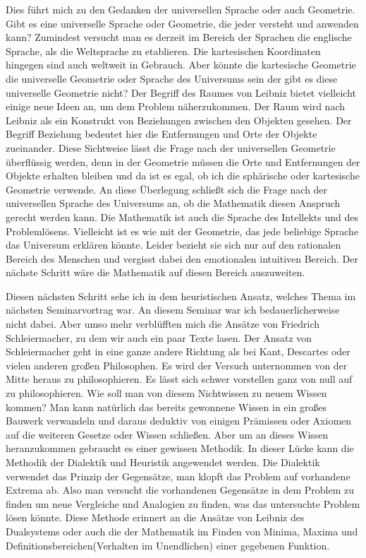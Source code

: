 \documentclass[DIN,
	fontsize=12pt,
a4paper]{scrartcl}
\begin{document}
Dies führt mich zu den Gedanken der universellen Sprache oder auch Geometrie.
Gibt es eine universelle Sprache oder Geometrie, die jeder versteht und anwenden kann? Zumindest versucht man es derzeit im Bereich der Sprachen die englische Sprache, als die Weltsprache zu etablieren.
Die kartesischen Koordinaten hingegen sind auch weltweit in Gebrauch.
Aber könnte die kartesische Geometrie die universelle Geometrie oder Sprache des Universums sein der gibt es diese universelle Geometrie nicht?
Der Begriff des Raumes von Leibniz bietet vielleicht einige neue Ideen an, um dem Problem näherzukommen.
Der Raum wird nach Leibniz als ein Konstrukt von Beziehungen zwischen den Objekten gesehen.
Der Begriff Beziehung bedeutet hier die Entfernungen und Orte der Objekte zueinander.
Diese Sichtweise lässt die Frage nach der universellen Geometrie überflüssig werden, denn in der Geometrie müssen die Orte und Entfernungen der Objekte erhalten bleiben und da ist es egal, ob ich die sphärische oder kartesische Geometrie verwende.
An diese Überlegung schließt sich die Frage nach der universellen Sprache des Universums an, ob die Mathematik diesen Anspruch gerecht werden kann.
Die Mathematik ist auch die Sprache des Intellekts und des Problemlösens.
Vielleicht ist es wie mit der Geometrie, das jede beliebige Sprache das Universum erklären könnte.
Leider bezieht sie sich nur auf den rationalen Bereich des Menschen und vergisst dabei den emotionalen intuitiven Bereich.
Der nächste Schritt wäre die Mathematik auf diesen Bereich auszuweiten.

Diesen nächsten Schritt sehe ich in dem heuristischen Ansatz, welches Thema im nächsten Seminarvortrag war.
An diesem Seminar war ich bedauerlicherweise nicht dabei.
Aber umso mehr verblüfften mich die Ansätze von Friedrich Schleiermacher, zu dem wir auch ein paar Texte lasen.
Der Ansatz von Schleiermacher geht in eine ganze andere Richtung als bei Kant, Descartes oder vielen anderen großen Philosophen.
Es wird der Versuch unternommen von der Mitte heraus zu philosophieren.
Es lässt sich schwer vorstellen ganz von null auf zu philosophieren.
Wie soll man von diesem Nichtwissen zu neuem Wissen kommen?
Man kann natürlich das bereits gewonnene Wissen in ein großes Bauwerk verwandeln und daraus deduktiv von einigen Prämissen oder Axiomen auf die weiteren Gesetze oder Wissen schließen.
Aber um an dieses Wissen heranzukommen gebraucht es einer gewissen Methodik.
In dieser Lücke kann die Methodik der Dialektik und Heuristik angewendet werden.
Die Dialektik verwendet das Prinzip der Gegensätze, man klopft das Problem auf vorhandene Extrema ab.
Also man versucht die vorhandenen Gegensätze in dem Problem zu finden um neue Vergleiche und Analogien zu finden, was das untersuchte Problem lösen könnte.
Diese Methode erinnert an die Ansätze von Leibniz des Dualsystems oder auch die der Mathematik im Finden von Minima, Maxima und Definitionsbereichen(Verhalten im Unendlichen) einer gegebenen Funktion.
\end{document}
